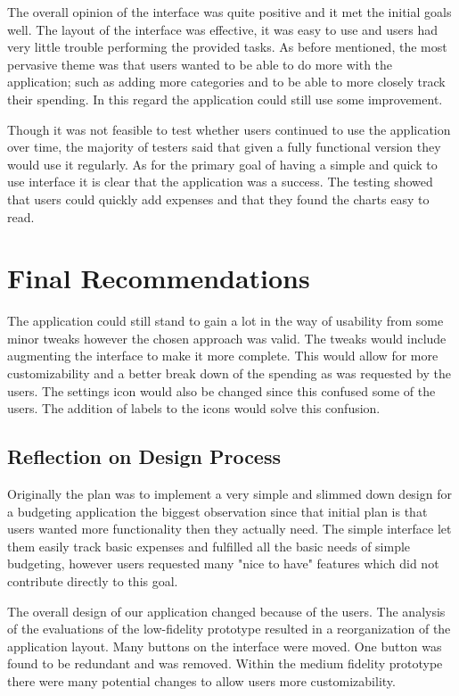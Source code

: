 \documentclass{chi2011}
\begin{document}
    The overall opinion of the interface was quite positive and it met the
    initial goals well. The layout of the interface was effective, it was easy
    to use and users had very little trouble performing the provided tasks. As
    before mentioned, the most pervasive theme was that users wanted to be able
    to do more with the application; such as adding more categories and to be
    able to more closely track their spending. In this regard the application
    could still use some improvement. 
    
    Though it was not feasible to test whether users continued to use the
    application over time, the majority of testers said that given a fully
    functional version they would use it regularly. As for the primary goal of
    having a simple and quick to use interface it is clear that the application
    was a success. The testing showed that users could quickly add expenses and
    that they found the charts easy to read.

\section{Final Recommendations}
	
The application could still stand to gain a lot in the way of usability from
some minor tweaks however the chosen approach was valid. The tweaks would
include augmenting the interface to make it more complete. This would allow for
more customizability and a better break down of the spending as was requested
by the users. The settings icon would also be changed since this confused some of the
users. The addition of labels to the icons would solve this confusion.

\subsection{Reflection on Design Process}

Originally the plan was to implement a very simple and slimmed down design
for a budgeting application the biggest observation since that initial plan
is that users wanted more functionality then they actually need. The simple
interface let them easily track basic expenses and fulfilled all the basic
needs of simple budgeting, however users requested many "nice to have" features
which did not contribute directly to this goal.

The overall design of our application changed because of the users. The analysis
of the evaluations of the low-fidelity prototype resulted in a reorganization of the
application layout. Many buttons on the interface were moved. One button
was found to be redundant and was removed. Within the medium fidelity
prototype there were many potential changes to allow users more
customizability.
\end{document}
